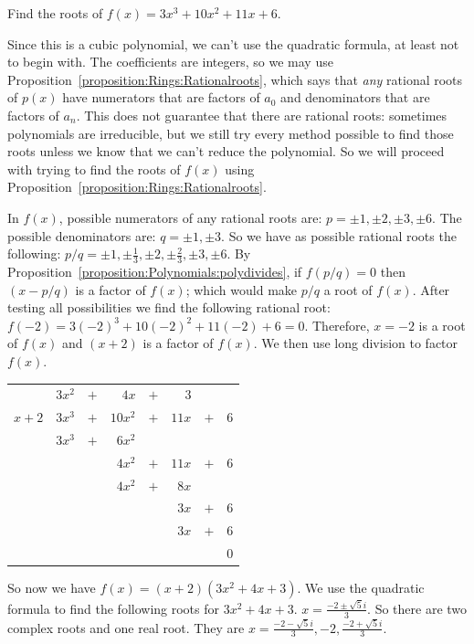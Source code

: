 \begin{example}{}
Find the roots of $f(x)=3x^3+10x^2+11x+6$.

Since this is a cubic polynomial, we can't use the quadratic formula, at least not to begin with. The coefficients are integers, so we may use Proposition~\ref{proposition:Rings:Rationalroots}, which says that \emph{any} rational roots of $p(x)$ have numerators that are factors of $a_{0}$ and denominators that  are factors of $a_{n}$. This does not guarantee that there are rational roots: sometimes polynomials are irreducible, but we still try every method possible to find those roots unless we know that we can't reduce the polynomial. So we will proceed with trying to find the roots of $f(x)$ using Proposition~\ref{proposition:Rings:Rationalroots}.

In $f(x)$, possible numerators of any rational roots are: $p=\pm1, \pm2, \pm3, \pm6$. The possible denominators are: $q=\pm1, \pm3$.
So we have as possible rational roots the following: $p/q= \pm1, \pm\frac{1}{3}, \pm2, \pm\frac{2}{3},\pm3, \pm6$.
By Proposition~\ref{proposition:Polynomials:polydivides}, if $f(p/q)=0$ then $(x-p/q)$ is a factor of $f(x)$; which would make $p/q$ a root of $f(x)$. After testing all possibilities we find the following rational root:
$f(-2)=3(-2)^3+10(-2)^2+11(-2)+6=0$. Therefore, $x=-2$ is a root of $f(x)$ and $(x+2)$ is a factor of $f(x)$.
We then use long division to factor $f(x)$.

\begin{center}
\begin{tabular}{rrcrcrcr}
        &  $3x^2$  &  $+$  &      $4x$  &  $+$  &    $3$  &       &       \\ \cline{2-8}
 \multicolumn{1}{r|}{$x + 2$}
        &  $3x^3$  &  $+$  &    $10x^2$  &  $+$  & $ 11x$  &  $+$  &  $6$  \\
        &  $3x^3$  &  $+$  &    $6 x^2$  &       &         &       &       \\ \cline{2-8}
        &         &       &                $4x^2$  & $+$  &  $ 11x$  &  $+$  &  $6$  \\
        &         &       &                $4x^2$  &  $+$  & $ 8x$  &       &       \\ \cline{4-8}
        &         &       &           &       &                         $3 x$  & $+$  & $6$  \\
        &         &       &           &       &                          $3x$  & $+$  & $6$  \\ \cline{6-8}
        &         &       &           &       &         &       &                               $0$
\end{tabular}
\end{center}
So now we have $f(x)=(x+2)(3x^2+4x+3)$. We use the quadratic formula to find the following roots for $3x^2+4x+3$.
$x=\frac{-2\pm \sqrt{5}i}{3}$.
So there are two complex roots and one real root. They are $x={\frac{-2 - \sqrt{5}i}{3}, -2, \frac{-2+ \sqrt{5}i}{3}}$.
\end{example}

